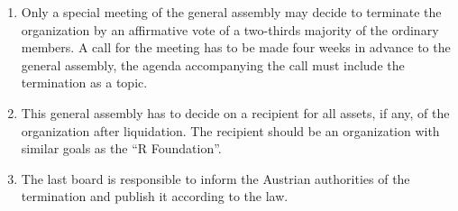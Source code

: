 \documentclass[a4paper]{article}
\newcommand{\RF}{"`R Foundation"'}
\begin{document}
\begin{enumerate}
 \item Only a special meeting of the general assembly may decide to
  terminate the organization by an affirmative vote of a two-thirds
  majority of the ordinary members.  A call for the meeting has to be
  made four weeks in advance to the general assembly, the agenda
  accompanying the call must include the termination as a topic.
  
 \item This general assembly has to decide on a recipient for all
  assets, if any, of the organization after liquidation. The recipient
  should be an organization with similar goals as the \RF{}.

 \item The last board is responsible to inform the Austrian
  authorities of the termination and publish it according to the law.
\end{enumerate}
\end{document}

